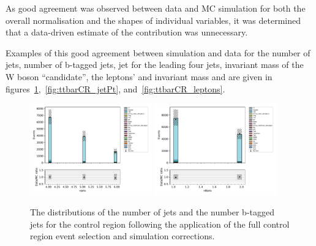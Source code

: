 As good agreement was observed between data and MC simulation for both the overall normalisation and the shapes of individual variables, it was determined that a data-driven estimate of the \ttbar contribution was unnecessary.

Examples of this good agreement between simulation and data for the number of jets, number of b-tagged jets, jet \pT for the leading four jets, invariant mass of the W boson ``candidate'', the leptons' \pt and invariant mass and \pt are given in figures~\ref{fig:ttbarCR_nJets},~\ref{fig:ttbarCR_jetPt}, and~\ref{fig:ttbarCR_leptons}.


\begin{figure}[tbp]
\centering
\includegraphics[width=0.47\textwidth]{figs/tzq-fullSelection-plots/plots_emu/nJets.pdf}
\includegraphics[width=0.47\textwidth]{figs/tzq-fullSelection-plots/plots_emu/nBjets.pdf}
\caption{
The distributions of the number of jets and the number b-tagged jets for the \ttbar control region following the application of the full control region event selection and simulation corrections.
}
\label{fig:ttbarCR_nJets}
\end{figure}

